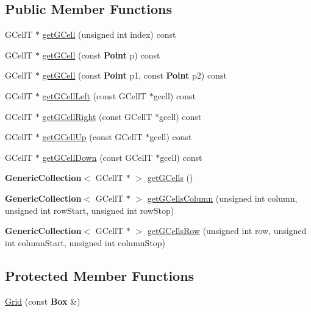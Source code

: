 \subsection*{Public Member Functions}
\begin{DoxyCompactItemize}
\item 
G\+CellT $\ast$ \mbox{\hyperlink{classKatabatic_1_1Grid_a98650c11b4aa0c6107c4d890dff61587}{get\+G\+Cell}} (unsigned int index) const
\item 
G\+CellT $\ast$ \mbox{\hyperlink{classKatabatic_1_1Grid_a0ee3cd2fb8c66458b0d00e39826921da}{get\+G\+Cell}} (const \textbf{ Point} p) const
\item 
G\+CellT $\ast$ \mbox{\hyperlink{classKatabatic_1_1Grid_a1beb5c490b2e651eab49178297b6cda2}{get\+G\+Cell}} (const \textbf{ Point} p1, const \textbf{ Point} p2) const
\item 
G\+CellT $\ast$ \mbox{\hyperlink{classKatabatic_1_1Grid_ae5041816e75468b69bb0bbf24a4e8eca}{get\+G\+Cell\+Left}} (const G\+CellT $\ast$gcell) const
\item 
G\+CellT $\ast$ \mbox{\hyperlink{classKatabatic_1_1Grid_a0e9bba0feb437dca932d59703298358e}{get\+G\+Cell\+Right}} (const G\+CellT $\ast$gcell) const
\item 
G\+CellT $\ast$ \mbox{\hyperlink{classKatabatic_1_1Grid_a3a22f2bce9124765eb937b78c90059a0}{get\+G\+Cell\+Up}} (const G\+CellT $\ast$gcell) const
\item 
G\+CellT $\ast$ \mbox{\hyperlink{classKatabatic_1_1Grid_a4288eb8b1357d9800341b82df6b23944}{get\+G\+Cell\+Down}} (const G\+CellT $\ast$gcell) const
\item 
\textbf{ Generic\+Collection}$<$ G\+CellT $\ast$ $>$ \mbox{\hyperlink{classKatabatic_1_1Grid_a24b4ab5b46b56ee744cf4c368a114d95}{get\+G\+Cells}} ()
\item 
\textbf{ Generic\+Collection}$<$ G\+CellT $\ast$ $>$ \mbox{\hyperlink{classKatabatic_1_1Grid_aa8d0393323104d48c089a8429b254689}{get\+G\+Cells\+Column}} (unsigned int column, unsigned int row\+Start, unsigned int row\+Stop)
\item 
\textbf{ Generic\+Collection}$<$ G\+CellT $\ast$ $>$ \mbox{\hyperlink{classKatabatic_1_1Grid_a35e2075302cdb696945f05c5bcc817a0}{get\+G\+Cells\+Row}} (unsigned int row, unsigned int column\+Start, unsigned int column\+Stop)
\end{DoxyCompactItemize}
\subsection*{Protected Member Functions}
\begin{DoxyCompactItemize}
\item 
\mbox{\hyperlink{classKatabatic_1_1Grid_a1b772cc784f7110caca47acb76dcec62}{Grid}} (const \textbf{ Box} \&)
\end{DoxyCompactItemize}


